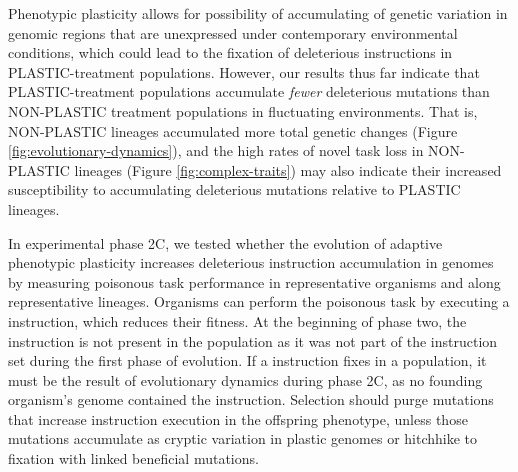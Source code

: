 



Phenotypic plasticity allows for possibility of accumulating of genetic variation in genomic regions that are unexpressed under contemporary environmental conditions, which could lead to the fixation of deleterious instructions in PLASTIC-treatment populations.
However, our results thus far indicate that PLASTIC-treatment populations accumulate \textit{fewer} deleterious mutations than NON-PLASTIC treatment populations in fluctuating environments.
That is, NON-PLASTIC lineages accumulated more total genetic changes (Figure \ref{fig:evolutionary-dynamics}), and the high rates of novel task loss in NON-PLASTIC lineages (Figure \ref{fig:complex-traits}) may also indicate their increased susceptibility to accumulating deleterious mutations relative to PLASTIC lineages.

In experimental phase 2C, we tested whether the evolution of adaptive phenotypic plasticity increases deleterious instruction accumulation in genomes by measuring poisonous task performance in representative organisms and along representative lineages. 
Organisms can perform the poisonous task by executing a  instruction, which reduces their fitness. 
At the beginning of phase two, the  instruction is not present in the population as it was not part of the instruction set during the first phase of evolution.
If a  instruction fixes in a population, it must be the result of evolutionary dynamics during phase 2C, as no founding organism's genome contained the  instruction.
Selection should purge mutations that increase  instruction execution in the offspring phenotype, unless those mutations accumulate as cryptic variation in plastic genomes or hitchhike to fixation with linked beneficial mutations.



